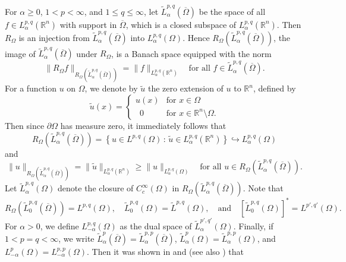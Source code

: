 \documentclass[reqno,centertags,11pt]{amsart}
\theoremstyle{definition}
\numberwithin{thm}{section}
\numberwithin{equation}{section}
\newcommand{\R}{{\mathbb{R}}}
\begin{document}
For $\alpha  \ge  0$, $1< p<\infty$, and $1 \le q \le \infty$,
let $\widetilde{L}_\alpha^{p,q} (\overline{\Omega} )$ be the  space of  all $f \in L_\alpha^{p,q}(\R^n )$ with support in $\overline{\Omega}$, which is a closed subspace of $L_\alpha^{p,q}(\R^n )$.   Then  $R_\Omega$ is an injection from $\widetilde{L}_\alpha^{p,q} (\overline{\Omega} )$ into $L_\alpha^{p,q}(\Omega  )$. Hence $R_\Omega  (\widetilde{L}_\alpha^{p,q} (\overline{\Omega} )  )$, the image of $\widetilde{L}_\alpha^{p,q} (\overline{\Omega} )$ under $R_\Omega$,  is a Banach space equipped with the norm
\[
\|R_\Omega f  \|_{R_\Omega  (\widetilde{L}_\alpha^{p,q} (\overline{\Omega} )  )} =  \|f\|_{L_\alpha^{p,q}(\R^n )} \quad \mbox{for all}\,\,  f\in \widetilde{L}_\alpha^{p,q} (\overline{\Omega} ) .
\]
For a function  $u$ on $\Omega$, we denote by $\widetilde{u}$ the zero extension of $u$ to $\R^n$, defined by
\[
\widetilde{u} (x)=
\begin{cases}
  u (x)    & \mbox{for}\,\,x \in \Omega  \\
 \,\,\, 0   & \mbox{for}\,\,x \in \R^n \setminus \Omega.
 \end{cases}
\]
Then since $\partial\Omega$ has measure zero, it immediately follows  that
$$
  R_\Omega  (\widetilde{L}_\alpha^{p,q} (\overline{\Omega} ) ) = \left\{ u \in L^{p,q}(\Omega ) \, :\, \widetilde{u} \in L_\alpha^{p,q}(\R^n ) \right\} \hookrightarrow L_\alpha^{p,q}(\Omega )
$$
and
\[
\|u\|_{R_\Omega  (\widetilde{L}_\alpha^{p,q} (\overline{\Omega} )  )} =  \|\widetilde{u}\|_{L_\alpha^{p,q}(\R^n )} \ge \|u\|_{L_\alpha^{p,q}(\Omega )} \quad\mbox{for all}\,\, u \in R_\Omega  (\widetilde{L}_\alpha^{p,q} (\overline{\Omega} ) ).
\]
Let    $\widetilde{L}_\alpha^{p,q}(\Omega )$ denote  the closure of $C_c^\infty (\Omega  )$ in $R_\Omega  (\widetilde{L}_\alpha^{p,q} (\overline{\Omega} )  )$.
Note  that
$$
R_\Omega  (\widetilde{L}_0^{p,q} (\overline{\Omega} ) ) = L^{p,q}(\Omega ),  \quad \widetilde{L}_0^{p,q}(\Omega ) =  \widetilde{L}^{p,q}(\Omega ),
\quad\mbox{and}\quad
\left[\widetilde{L}_0^{p,q}(\Omega )\right]^* = L^{p',q'}(\Omega ) .
$$
For $\alpha >0$, we define $L_{-\alpha}^{p,q}(\Omega )$ as the dual space of $\widetilde{L}_{\alpha}^{p',q'}(\Omega )$.
Finally, if $ 1< p=q  <\infty$,  we write    $\widetilde{L}_\alpha^{p}(\overline{\Omega} ) = \widetilde{L}_\alpha^{p,p}(\overline{\Omega} )$, $\widetilde{L}_\alpha^{p}(\Omega ) = \widetilde{L}_\alpha^{p,p}(\Omega )$,  and  $L_{-\alpha}^{p}(\Omega ) = L_{-\alpha}^{p,p}(\Omega )$.
Then it was shown in  \cite[Remark 2.7]{JK} and   \cite[p.329]{FMM} (see also \cite[Theorem 3.5]{triebel02}) that
\end{document}
